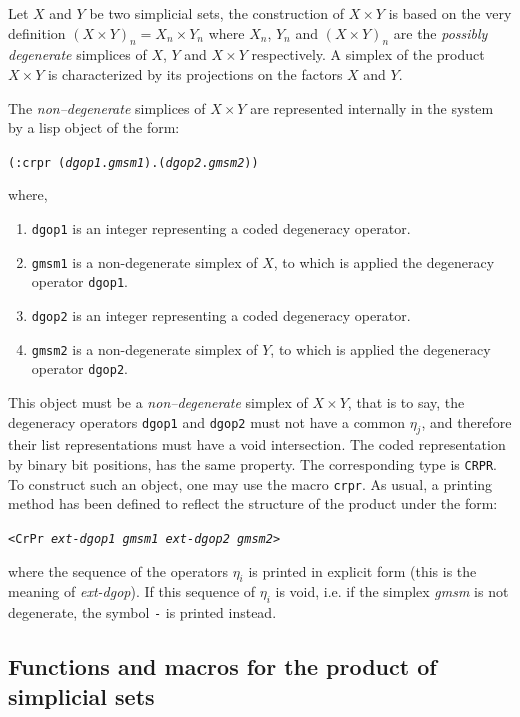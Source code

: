 {Let $X$ and $Y$ be two simplicial
sets, the construction of $X\times Y$ is based on the very definition $(X\times Y)_n =X_n\times Y_n$
where $X_n$, $Y_n$ and $(X\times Y)_n$ are the {\em possibly degenerate} simplices of $X$, $Y$ and $X\times Y$
respectively. A simplex of the product $X\times Y$ is characterized  by its projections on the factors $X$ and $Y$.
\par
The {\em non--degenerate} simplices of $X\times Y$  are
represented internally in the system by a lisp object of the form:
\begin{center}
{\tt (:crpr ({\em dgop1}.{\em gmsm1}).({\em dgop2}.{\em gmsm2}))}
\end{center}
where,
\begin{enumerate}
\item {\tt dgop1} is an integer representing a coded degeneracy operator.
\item {\tt gmsm1} is a non-degenerate simplex of $X$, to which is applied the degeneracy operator
{\tt dgop1}.
\item {\tt dgop2} is an integer representing a coded degeneracy operator.
\item {\tt gmsm2} is a non-degenerate simplex of $Y$, to which is applied the degeneracy operator
{\tt dgop2}.
\end{enumerate}
This object must be a {\em non--degenerate} simplex of $X \times Y$,
that is to say, the degeneracy operators {\tt dgop1} and {\tt dgop2} must not have a common $\eta_j$, and 
therefore their list representations must have a void intersection.
The coded representation by  binary bit positions, has the same property. The corresponding type
is {\tt CRPR}.
To construct such an object, one may use the macro {\tt crpr}. As usual, a printing method
has been defined to reflect the structure of the product under the form:
\begin{center}
{\tt <CrPr {\em ext-dgop1 gmsm1 ext-dgop2 gmsm2}> }
\end{center}
where  the sequence of the operators $\eta_i$ is printed in explicit form (this is the meaning of {\em ext-dgop}).
If this sequence of $\eta_i$  is void, i.e. if the simplex {\em gmsm} is not degenerate, 
the symbol {\tt -} is printed instead.
\newpage

\subsection {Functions and macros for the product of simplicial sets}

}
